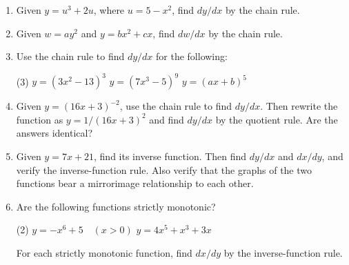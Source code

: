 \documentclass{./../../Latex/homework}
\begin{document}
\begin{enumerate}

\item Given $y=u^{3}+2 u$, where $u=5-x^{2}$, find $d y / d x$ by the chain rule.

\item Given $w=a y^{2}$ and $y=b x^{2}+c x$, find $d w / d x$ by the chain rule.

\item Use the chain rule to find $d y / d x$ for the following:
\begin{tasks}(3)
\task $y=\left(3 x^{2}-13\right)^{3}$
\task $y=\left(7 x^{3}-5\right)^{9}$
\task $y=(a x+b)^{5}$
\end{tasks}

\item Given $y=(16 x+3)^{-2}$, use the chain rule to find $d y / d x$. Then rewrite the function as $y=1 /(16 x+3)^{2}$ and find $d y / d x$ by the quotient rule. Are the answers identical?

\item Given $y=7 x+21$, find its inverse function. Then find $d y / d x$ and $d x / d y$, and verify the inverse-function rule. Also verify that the graphs of the two functions bear a mirrorimage relationship to each other.

\item Are the following functions strictly monotonic?
\begin{tasks}(2)
\task $y=-x^{6}+5 \quad(x>0)$
\task $y=4 x^{5}+x^{3}+3 x$
\end{tasks}
For each strictly monotonic function, find $d x / d y$ by the inverse-function rule.
\end{enumerate}
\end{document}
